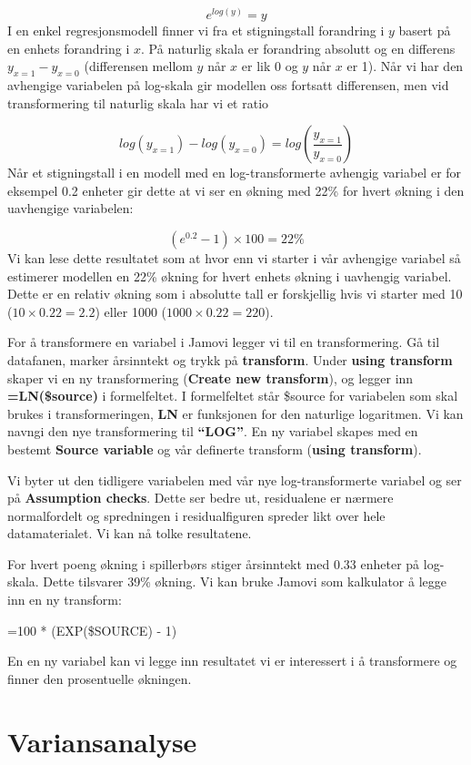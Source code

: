\documentclass[
  letterpaper,
  DIV=11,
  numbers=noendperiod,
  oneside]{scrreprt}
\begin{document}
\[e^{log(y)} = y\] I en enkel regresjonsmodell finner vi fra et
stigningstall forandring i \(y\) basert på en enhets forandring i \(x\).
På naturlig skala er forandring absolutt og en differens
\(y_{x=1} - y_{x=0}\) (differensen mellom \(y\) når \(x\) er lik 0 og
\(y\) når \(x\) er 1). Når vi har den avhengige variabelen på log-skala
gir modellen oss fortsatt differensen, men vid transformering til
naturlig skala har vi et ratio

\[log(y_{x=1}) - log(y_{x=0}) = log(\frac{y_{x=1}}{y_{x=0}})\] Når et
stigningstall i en modell med en log-transformerte avhengig variabel er
for eksempel 0.2 enheter gir dette at vi ser en økning med 22\% for
hvert økning i den uavhengige variabelen:

\[(e^{0.2} -1) \times 100 = 22\%\] Vi kan lese dette resultatet som at
hvor enn vi starter i vår avhengige variabel så estimerer modellen en
22\% økning for hvert enhets økning i uavhengig variabel. Dette er en
relativ økning som i absolutte tall er forskjellig hvis vi starter med
10 (\(10\times 0.22=2.2\)) eller 1000 (\(1000 \times 0.22 = 220\)).

For å transformere en variabel i Jamovi legger vi til en transformering.
Gå til datafanen, marker årsinntekt og trykk på \textbf{transform}.
Under \textbf{using transform} skaper vi en ny transformering
(\textbf{Create new transform}), og legger inn \textbf{=LN(\$source)} i
formelfeltet. I formelfeltet står \$source for variabelen som skal
brukes i transformeringen, \textbf{LN} er funksjonen for den naturlige
logaritmen. Vi kan navngi den nye transformering til \textbf{``LOG''}.
En ny variabel skapes med en bestemt \textbf{Source variable} og vår
definerte transform (\textbf{using transform}).

Vi byter ut den tidligere variabelen med vår nye log-transformerte
variabel og ser på \textbf{Assumption checks}. Dette ser bedre ut,
residualene er nærmere normalfordelt og spredningen i residualfiguren
spreder likt over hele datamaterialet. Vi kan nå tolke resultatene.

For hvert poeng økning i spillerbørs stiger årsinntekt med 0.33 enheter
på log-skala. Dette tilsvarer 39\% økning. Vi kan bruke Jamovi som
kalkulator å legge inn en ny transform:

=100 * (EXP(\$SOURCE) - 1)

En en ny variabel kan vi legge inn resultatet vi er interessert i å
transformere og finner den prosentuelle økningen.

\hypertarget{variansanalyse}{%
\section{Variansanalyse}\label{variansanalyse}}
\end{document}
